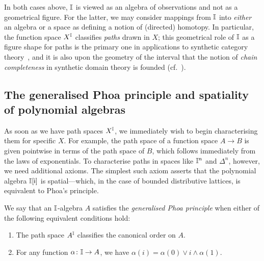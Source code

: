 In both cases above, $\mathbb{I}$ is viewed as an algebra of observations and not as a geometrical figure. For the latter, we may consider mappings from $\mathbb{I}$ into \emph{either} an algebra or a space as defining a notion of (directed) homotopy. In particular, the function space $X^{\mathbb{I}}$ classifies \emph{paths} drawn in $X$; this geometrical role of $\mathbb{I}$ as a figure shape for paths is the primary one in applications to synthetic category theory~\citep{riehl2017type}, and it is also upon the geometry of the interval that the notion of \emph{chain completeness} in synthetic domain theory is founded (cf.\ ).

\subsection{The generalised Phoa principle and spatiality of polynomial algebras}

As soon as we have path spaces $X^{\mathbb{I}}$, we immediately wish to begin characterising them for specific $X$. For example, the path space of a function space $A\to B$ is given pointwise in terms of the path space of $B$, which follows immediately from the laws of exponentials. To characterise paths in spaces like $\mathbb{I}^n$ and $\Delta^n$, however, we need additional axioms. The simplest such axiom asserts that the polynomial algebra $\mathbb{I}[\mathsf{i}]$ is spatial---which, in the case of bounded distributive lattices, is equivalent to Phoa's principle.

\begin{definition}\label{def:gen-phoa}
  We say that an $\mathbb{I}$-algebra $A$ satisfies the \emph{generalised Phoa principle} when either of the following equivalent conditions hold:
  \begin{enumerate}
    \item The path space $A^{\mathbb{I}}$ classifies the canonical order on $A$.
    \item For any function $\alpha\colon \mathbb{I}\to A$, we have $\alpha(i) = \alpha(0)\vee i \wedge \alpha(1)$.
  \end{enumerate}
\end{definition}

